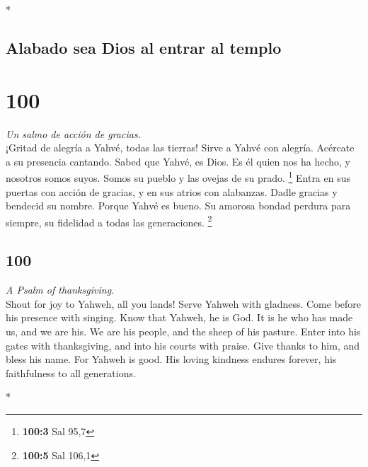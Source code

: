 \begin{paracol}{2}
\begin{otherlanguage}{english}
\end{otherlanguage}

\switchcolumn[0]*

\hypertarget{alabado-sea-dios-al-entrar-al-templo}{%
\subsection{Alabado sea Dios al entrar al
templo}\label{alabado-sea-dios-al-entrar-al-templo}}

\hypertarget{section-198}{%
\section{100}\label{section-198}}

\emph{Un salmo de acción de gracias.}\\
 ¡Gritad de alegría a Yahvé, todas las tierras!
 Sirve a Yahvé con alegría. Acércate a su presencia
cantando.  Sabed que Yahvé, es Dios. Es él quien nos ha
hecho, y nosotros somos suyos. Somos su pueblo y las ovejas de su prado.
\footnote{\textbf{100:3} Sal 95,7}  Entra en sus puertas
con acción de gracias, y en sus atrios con alabanzas. Dadle gracias y
bendecid su nombre.  Porque Yahvé es bueno. Su amorosa
bondad perdura para siempre, su fidelidad a todas las generaciones.
\footnote{\textbf{100:5} Sal 106,1}

\switchcolumn
\begin{otherlanguage}{english}

\hypertarget{section-199}{%
\section{100}\label{section-199}}

\emph{A Psalm of thanksgiving.}\\
 Shout for joy to Yahweh, all you lands! 
Serve Yahweh with gladness. Come before his presence with singing.
 Know that Yahweh, he is God. It is he who has made us,
and we are his. We are his people, and the sheep of his pasture.
 Enter into his gates with thanksgiving, and into his
courts with praise. Give thanks to him, and bless his name.
 For Yahweh is good. His loving kindness endures forever,
his faithfulness to all generations.

\end{otherlanguage}

\switchcolumn[0]*


\end{paracol}
